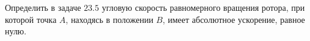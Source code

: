 Определить в задаче $23.5$ угловую скорость равномерного вращения ротора,
при которой точка $A$, находясь в положении $B$,
имеет абсолютное ускорение, равное нулю.
